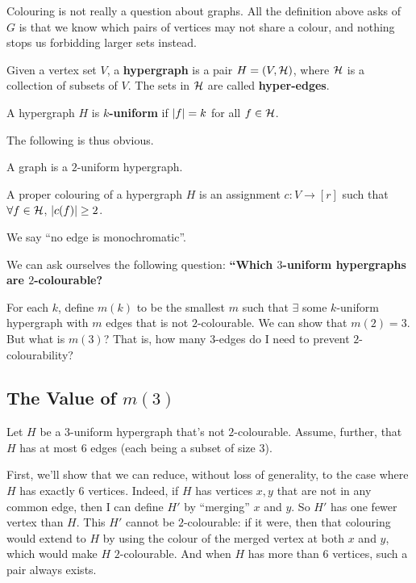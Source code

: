 Colouring is not really a question about graphs. All the definition above asks of $G$ is that we know which pairs of vertices may not share a colour, and nothing stops us forbidding larger sets instead.

\begin{boxdefinition}[Hypergraph] \label{Ch2:Def:Hypergraph}
    Given a vertex set $V$, a \textbf{hypergraph} is a pair $H = \left( V, \mathcal{H} \right)$, where $\mathcal{H}$ is a collection of subsets of $V$. The sets in $\mathcal{H}$ are called \textbf{hyper-edges}.
\end{boxdefinition}

\begin{boxdefinition}[Uniformity]
    A hypergraph $H$ is \textbf{$k$-uniform} if $\left\lvert f \right\rvert = k$ for all $f \in \mathcal{H}$.
\end{boxdefinition}

The following is thus obvious.

\begin{boxproposition}
    A graph is a $2$-uniform hypergraph.
\end{boxproposition}

\begin{boxdefinition}
A proper colouring of a hypergraph $H$ is an assignment $c : V \to [r]$ such that $\forall f \in \mathcal{H}$, $\left\lvert c(f) \right\rvert \geq 2$.
\end{boxdefinition}

We say ``no edge is monochromatic''.

We can ask ourselves the following question: \textbf{``Which $3$-uniform hypergraphs are $2$-colourable?}

For each $k$, define $m(k)$ to be the smallest $m$ such that $\exists$ some $k$-uniform hypergraph with $m$ edges that is not $2$-colourable. We can show that $m(2) = 3$. But what is $m(3)$? That is, how many $3$-edges do I need to prevent $2$-colourability?

\subsection{The Value of $m(3)$}

Let $H$ be a $3$-uniform hypergraph that's not $2$-colourable. Assume, further, that $H$ has at most $6$ edges (each being a subset of size $3$).

First, we'll show that we can reduce, without loss of generality, to the case where $H$ has exactly $6$ vertices. Indeed, if $H$ has vertices $x, y$ that are not in any common edge, then I can define $H'$ by ``merging'' $x$ and $y$. So $H'$ has one fewer vertex than $H$. This $H'$ cannot be $2$-colourable: if it were, then that colouring would extend to $H$ by using the colour of the merged vertex at both $x$ and $y$, which would make $H$ $2$-colourable. And when $H$ has more than $6$ vertices, such a pair always exists.

